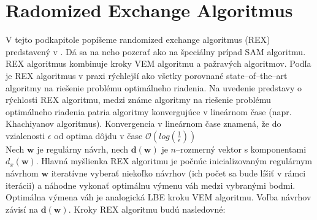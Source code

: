 \section {Radomized Exchange Algoritmus}

V tejto podkapitole popíšeme randomized exchange algoritmus (REX) predstavený v \cite{rex_harman}. Dá sa na neho pozerať ako na špeciálny prípad SAM algoritmu. REX algoritmus kombinuje kroky VEM algoritmu a pažravých algoritmov. Podľa \cite{rex_harman} je REX algoritmus v praxi rýchlejší ako všetky porovnané state--of--the--art algoritmy na riešenie problému optimálneho riadenia. Na uvedenie predstavy o rýchlosti REX algoritmu, medzi známe algoritmy na riešenie problému optimálneho riadenia patria algoritmy konvergujúce v lineárnom čase (napr. Khachiyanov algoritmus). Konvergencia v lineárnom čase znamená, že do vzialenosti $\epsilon$ od optima dôjdu v čase $\mathcal{O}(log(\frac{1}{\epsilon}))$ \\

Nech $\mathbf w$ je regulárny návrh, nech $\mathbf {d(w)}$ je $n$--rozmerný vektor s komponentami $d_x(\mathbf w)$. Hlavná myšlienka REX algoritmu je počnúc inicializovaným regulárnym návrhom $\mathbf w$ iteratívne vyberať niekoľko návrhov (ich počet sa bude líšiť v rámci iterácii) a náhodne vykonať optimálnu výmenu váh medzi vybranými bodmi. Optimálna výmena váh je analogická LBE kroku VEM algoritmu. Voľba návrhov závisí na $\mathbf{d(w)}$. Kroky REX algoritmu budú nasledovné:

